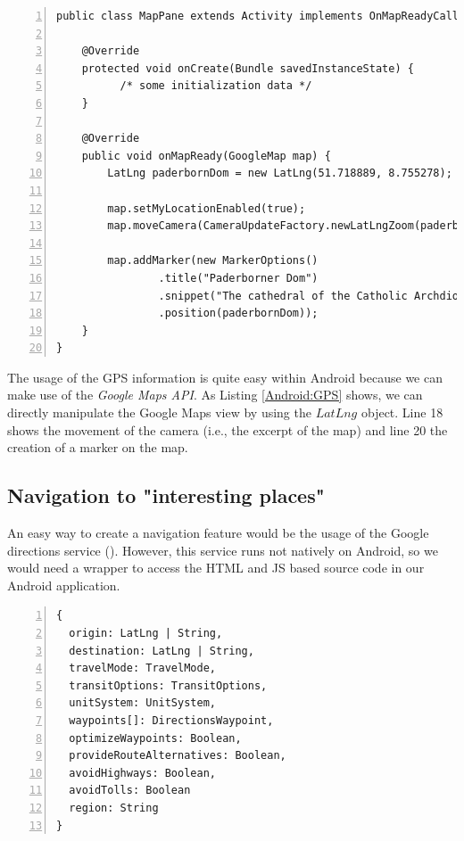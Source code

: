 \begin{lstlisting}[numbers=left,caption={Example for using the GPS coordinates within an Android application},label=Android:GPS,frame=tlbr,breaklines]
public class MapPane extends Activity implements OnMapReadyCallback {

    @Override
    protected void onCreate(Bundle savedInstanceState) {
	      /* some initialization data */
    }

    @Override
    public void onMapReady(GoogleMap map) {
        LatLng paderbornDom = new LatLng(51.718889, 8.755278);

        map.setMyLocationEnabled(true);
        map.moveCamera(CameraUpdateFactory.newLatLngZoom(paderbornDom, 13));

        map.addMarker(new MarkerOptions()
                .title("Paderborner Dom")
                .snippet("The cathedral of the Catholic Archdiocese of Paderborn")
                .position(paderbornDom));
    }
}
\end{lstlisting}

The usage of the \ac{GPS} information is quite easy within Android because we can make use of the \emph{Google Maps API}. As Listing \ref{Android:GPS} shows, we can directly manipulate the Google Maps view by using the $LatLng$ object. Line 18 shows the movement of the camera (i.e., the excerpt of the map) and line 20 the creation of a marker on the map. 

\subsection{Navigation to "interesting places"}
An easy way to create a navigation feature would be the usage of the Google directions service (\cite{GoogleNavi}). However, this service runs not natively on Android, so we would need a wrapper to access the \ac{HTML} and \ac{JS} based source code in our Android application. 

\begin{lstlisting}[numbers=left,caption={Example for construction of the DirectionsRequest JSON object that is needed to use the directions service},label=Android:dirService,frame=tlbr,breaklines]
{
  origin: LatLng | String,
  destination: LatLng | String,
  travelMode: TravelMode,
  transitOptions: TransitOptions,
  unitSystem: UnitSystem,
  waypoints[]: DirectionsWaypoint,
  optimizeWaypoints: Boolean,
  provideRouteAlternatives: Boolean,
  avoidHighways: Boolean,
  avoidTolls: Boolean
  region: String
}
\end{lstlisting}

